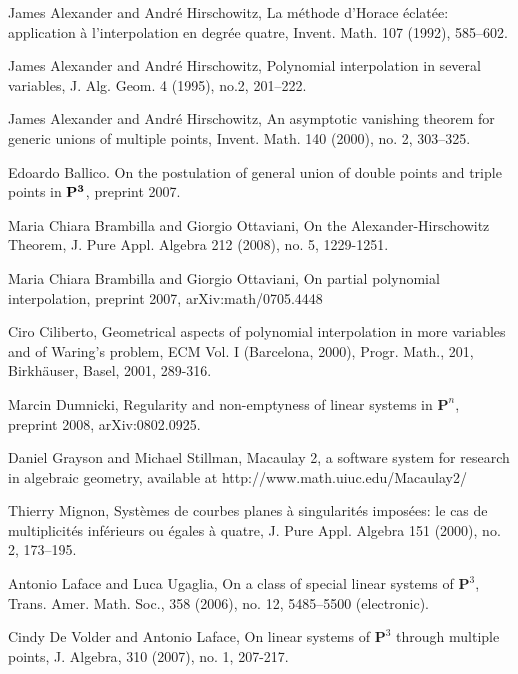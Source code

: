 \documentclass{amsart}
\theoremstyle{plain}
\theoremstyle{definition}
\begin{document}
\medskip

\providecommand{\bysame}{\leavevmode\hbox to3em{\hrulefill}\thinspace}

\begin{thebibliography}{99}

 James Alexander and Andr\'e Hirschowitz,
La m\'ethode d'Horace \'eclat\'ee: application \`a l'interpolation en
degr\'ee quatre, Invent. Math. 107 (1992), 585--602.

 James Alexander and Andr\'e Hirschowitz, Polynomial
  interpolation in several variables, J. Alg. Geom. 4 (1995), no.2, 201--222.

James Alexander and Andr\'e Hirschowitz, An asymptotic vanishing
theorem for generic unions of multiple points, Invent. Math.
{140} (2000), no. 2, 303--325.

 Edoardo Ballico. On the postulation of general union of double points and triple points
in $\bf{P}^3$, preprint 2007.

 Maria Chiara Brambilla and Giorgio Ottaviani, On the
  Alexander-Hirschowitz Theorem, J. Pure Appl. Algebra 212
  (2008), no. 5, 1229-1251.

 Maria Chiara Brambilla and Giorgio Ottaviani, On
  partial polynomial interpolation, preprint 2007,
 arXiv:math/0705.4448

 Ciro Ciliberto, Geometrical aspects of polynomial
  interpolation in more variables and
of Waring's problem, ECM Vol. I (Barcelona, 2000),
 Progr. Math., 201, Birkh\"auser, Basel, 2001, 289-316.

 Marcin Dumnicki, Regularity and non-emptyness of
  linear systems in ${\mathbf P}^n$, preprint 2008, arXiv:0802.0925.

 Daniel Grayson and Michael Stillman,
          Macaulay 2, a software system for research
                   in algebraic geometry, available at http://www.math.uiuc.edu/Macaulay2/

 Thierry Mignon, Syst\`{e}mes de courbes planes \`{a} singularit\'{e}s impos\'{e}es: le cas de multiplicit\'{e}s
inf\'{e}rieurs ou \'{e}gales \`{a} quatre, J. Pure Appl. Algebra 151 (2000), no. 2, 173--195.

 Antonio Laface and Luca Ugaglia,
{On a class of special linear systems of ${\mathbf P}^3$},
{Trans. Amer. Math. Soc.}, {358} (2006), no. 12, 5485--5500 (electronic).

 Cindy De Volder and Antonio Laface,
{On linear systems of ${\mathbf P}^3$ through multiple points},
{J. Algebra}, 310 (2007), no. 1, 207-217.

\end{thebibliography}
\end{document}
